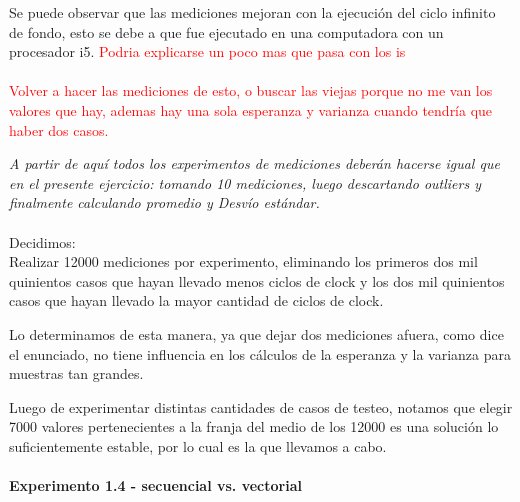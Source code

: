 Se puede observar que las mediciones mejoran con la ejecuci\'on del ciclo infinito de fondo, esto se debe a que fue ejecutado en una computadora con un procesador i5. \textcolor{red}{Podria explicarse un poco mas que pasa con los is}\\
\\
\textcolor{red}{Volver a hacer las mediciones de esto, o buscar las viejas porque no me van los valores que hay, ademas hay una sola esperanza y varianza cuando tendr\'ia que haber dos casos.}


 \bigskip
\textit{A partir de aquí todos los experimentos de mediciones deberán hacerse igual 
que en el presente ejercicio: tomando 10 mediciones, luego descartando 
outliers y finalmente calculando promedio y Desvío est\'andar.}\\
\\
Decidimos: \\

Realizar 12000 mediciones por experimento, eliminando los primeros dos mil quinientos casos que hayan llevado menos ciclos de clock y los dos mil quinientos casos que hayan llevado la mayor cantidad de ciclos de clock. 

Lo determinamos de esta manera, ya que dejar dos mediciones afuera, como dice el enunciado, no tiene influencia en los c\'alculos de la esperanza y la varianza para muestras tan grandes. 

Luego de experimentar distintas cantidades de casos de testeo, notamos que elegir 7000 valores pertenecientes a la franja del medio de los 12000 es una soluci\'on lo suficientemente estable, por lo cual es la que llevamos a cabo. \\
\\
\newpage
\noindent\textbf{Experimento 1.4 - secuencial vs. vectorial}

